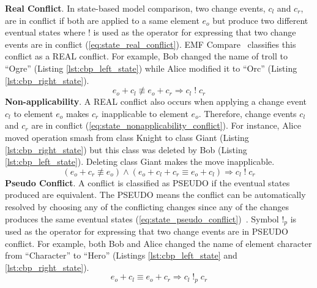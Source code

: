 \textbf{Real Conflict}. In state-based model comparison, two change events, $c_{l}$ and $c_{r}$, are in conflict if both are applied to a same element $e_{o}$ but produce two different eventual states where $!$ is used as the operator for expressing that two change events are in conflict (\ref{eq:state_real_conflict}). EMF Compare~\cite{emfcompare2018developer} classifies this conflict as a \textsf{REAL} conflict. For example, Bob changed the \textsf{name} of \textsf{troll} to ``Ogre'' (Listing \ref{lst:cbp_left_state}) while Alice modified it to ``Orc'' (Listing \ref{lst:cbp_right_state}). 
\begin{equation} \label{eq:state_real_conflict}
e_{o} + c_{l} \not\equiv e_{o} + c_{r} \Rightarrow c_{l}\;!\;c_{r}
\end{equation} 
\textbf{Non-applicability}. A \textsf{REAL} conflict also occurs when applying a change event $c_{l}$ to element $e_{o}$ makes $c_{r}$ inapplicable to element $e_{o}$. Therefore, change events $c_{l}$ and $c_{r}$ are in conflict (\ref{eq:state_nonapplicability_conflict}). 
For instance, Alice moved operation \textsf{smash} from class \textsf{Knight} to class \textsf{Giant} (Listing \ref{lst:cbp_right_state}) but this class was deleted by Bob (Listing \ref{lst:cbp_left_state}). Deleting class \textsf{Giant} makes the move inapplicable. 
\begin{equation} \label{eq:state_nonapplicability_conflict}
(e_{o} + c_{r} \not\equiv e_{o}) \wedge (e_{o} + c_{l} + c_{r} \equiv e_{o} + c_{l}) \Rightarrow c_{l}\;!\;c_{r}
\end{equation}
\textbf{Pseudo Conflict}. A conflict is classified as \textsf{PSEUDO} if the eventual states produced are equivalent. The \textsf{PSEUDO} means the conflict can be automatically resolved by choosing any of the conflicting changes since any of the changes produces the same eventual states (\ref{eq:state_pseudo_conflict})~\cite{emfcompare2018developer}. Symbol $!_{p}$ is used as the operator for expressing that two change events are in \textsf{PSEUDO} conflict. For example, both Bob and Alice changed the \textsf{name} of element \textsf{character} from ``Character'' to ``Hero'' (Listings \ref{lst:cbp_left_state} and \ref{lst:cbp_right_state}). 
\begin{equation} \label{eq:state_pseudo_conflict}
e_{o} + c_{l} \equiv e_{o} + c_{r} \Rightarrow c_{l}\;!_{p}\;c_{r}
\end{equation} 
